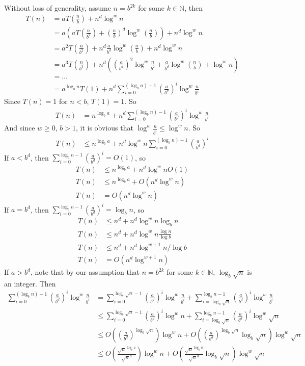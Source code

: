 \documentclass[12pt,letterpaper]{article}
\begin{document}
\section{}
Without loss of generality, assume $n=b^{2k}$ for some $k\in\mathbb{N}$, then 
\begin{align}
    T(n)&=aT(\frac{n}{b})+n^d\log^wn\\
    &=a(aT(\frac{n}{b^2})+(\frac{n}{b})^d\log^w(\frac{n}{b}))+n^d\log^wn\\
    &=a^2T(\frac{n}{b^2})+n^d\frac{a}{b^d}\log^w(\frac{n}{b})+n^d\log^wn\\
    &=a^3T(\frac{n}{b^3})+n^d((\frac{a}{b^d})^2\log^w\frac{n}{b^2}+\frac{a}{b^d}\log^w(\frac{n}{b})+\log^wn)\\
    &=\dots\\
    &=a^{\log_bn}T(1)+n^d\sum_{i=0}^{(\log_bn)-1}(\frac{a}{b^d})^i\log^w{\frac{n}{b^i}}
\end{align}
Since $T(n)=1$ for $n<b$, $T(1)=1$. So 
\begin{align}
    T(n)&=n^{\log_ba}+n^d\sum_{i=0}^{(\log_bn)-1}(\frac{a}{b^d})^i\log^w{\frac{n}{b^i}}
\end{align}
And since $w\geq0$, $b>1$, it is obvious that $\log^w\frac{n}{b^i}\leq\log^wn$. So \\
\begin{align}
    T(n)&\leq n^{\log_ba}+n^d\log^wn\sum_{i=0}^{(\log_bn)-1}(\frac{a}{b^d})^i
\end{align}
If $a<b^d$, then $\sum_{i=0}^{\log_bn-1}(\frac{a}{b^d})^i=O(1)$, so
\begin{align}
    T(n)&\leq n^{\log_ba}+n^d\log^wnO(1)\\
    T(n)&\leq n^{\log_ba}+O(n^d\log^wn)\\
    T(n)&=O(n^d\log^wn)
\end{align}
If $a=b^d$, then $\sum_{i=0}^{\log_bn-1}(\frac{a}{b^d})^i=\log_bn$, so
\begin{align}
    T(n)&\leq n^d+n^d\log^wn\log_bn\\
    T(n)&\leq n^d+n^d\log^wn\frac{\log n}{\log b}\\
    T(n)&\leq n^d+n^d\log^{w+1}n/\log b\\
    T(n)&=O(n^d\log^{w+1}n)
\end{align}
If $a>b^d$, note that by our assumption that $n=b^{2k}$ for some $k\in\mathbb{N}$, $\log_{b}\sqrt{n}$ is an integer. Then 
\begin{align}
    \sum_{i=0}^{(\log_bn)-1}(\frac{a}{b^d})^i\log^w{\frac{n}{b^i}}&=\sum_{i=0}^{\log_{b}\sqrt{n}-1}(\frac{a}{b^d})^i\log^w\frac{n}{b^i}+\sum_{i=\log_{b}\sqrt{n}}^{\log_{b}n-1}(\frac{a}{b^d})^i\log^w\frac{n}{b^i}\\
    &\leq \sum_{i=0}^{\log_{b}\sqrt{n}-1}(\frac{a}{b^d})^i\log^wn+\sum_{i=\log_{b}\sqrt{n}}^{\log_{b}n-1}(\frac{a}{b^d})^i\log^w\sqrt{n}\\
    &\leq O((\frac{a}{b^d})^{\log_b{\sqrt{n}}})\log^wn+O((\frac{a}{b^d})^{\log_b{\sqrt{n}}}\log_b\sqrt{n})\log^w\sqrt{n} \\
    &\leq O(\frac{\sqrt{n}^{\log_ba}}{\sqrt{n}^{d}})\log^wn+O(\frac{\sqrt{n}^{\log_ba}}{\sqrt{n}^{d}}\log_b\sqrt{n})\log^w\sqrt{n}
\end{align}
\end{document}
